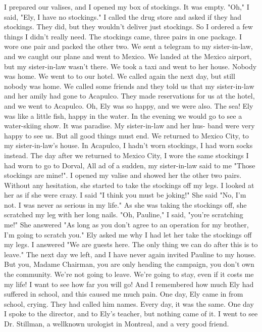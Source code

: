 I prepared our valises, and I opened my box of stockings.
It was empty.
"Oh," I said, "Ely, I have no stockings."
I called the drug store and asked 
 if they had stockings.
They did, but they wouldn't deliver just stockings.
So I ordered a few things I didn't really need.
The stockings came, three 
pairs in one package.
I wore one pair and packed the other two.
We sent 
a telegram to my sister-in-law, and we caught our plane and went to Mexico.
We landed at the Mexico airport, but my sister-in-law wasn't 
there.
We took a taxi and went to her house.
Nobody was home.
We went to 
to our hotel.
We called again the next day, but still nobody was home.
We called some friends and they told us that my sister-in-law and her amily 
had gone to Acapulco.
They made reservations for us at the hotel, and we 
went to Acapulco.
Oh, Ely was so happy, and we were also.
The sea!
Ely 
was like a little fish, happy in the water.
In the evening we would go to 
see a water-skiing show.
It was paradise.
My sister-in-law and her hus-
band were very happy to see us.
But all good things must end.
We returned to Mexico City, to my sister-in-law's house.
In Acapulco, I hadn't worn stockings, I had worn socks instead.
The day after we returned to Mexico City, I wore the same stockings I had worn to go to Dorval, All ad of a sudden, my sister-in-law said to me "Those stockings are mine!".
I opened my valise and showed her the other two pairs.
Without any hesitation, she started to take the stockings off my legs.
I 
looked at her as if she were crazy.
I said "I think you must be joking!"
She said "No, I'm not.
I was never as serious in my life."
As she was 
taking the stockings off, she scratched my leg with her long nails.
"Oh, 
Pauline," I said, "you're scratching me!"
She answered "As long as you don’t 
agree to an operation for my brother, I'm going to scratch you."
Ely asked 
me why I had let her take the stockings off my legs.
I answered "We are 
guests here.
The only thing we can do after this is to leave."
The next 
day we left, and I have never again invited Pauline to my house.
But you, Madame Chairman, you are only heading the campaign, you don't 
own the community.
We're not going to leave.
We're going to stay, even 
if it costs me my life!
I want to see how far you will go!
And I remembered 
how much Ely had suffered in school, and this caused me much pain.
One day, Ely came in from school, crying.
They had called him names.
Every day, it was the same.
One day I spoke to the director, and to 
Ely's teacher, but nothing came of it.
I went to see Dr.
Stillman, a wellknown urologist in Montreal, and a very good friend.

